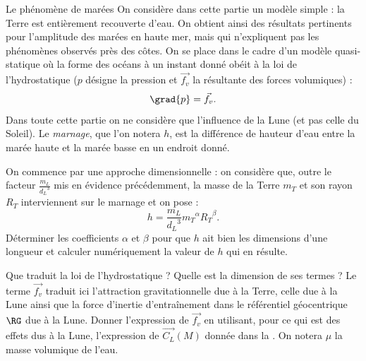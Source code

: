 \begin{exo}[PC][1][devoir]{Le phénomène de marées}
  On considère dans cette partie un modèle simple : la Terre est entièrement recouverte d'eau. On obtient ainsi des résultats pertinents pour l'amplitude des marées en haute mer, mais qui n'expliquent pas les phénomènes observés près des côtes.
  On se place dans le cadre d'un modèle quasi-statique où la forme des océans à un instant donné obéit à la loi de l'hydrostatique ($p$ désigne la pression et $\Vec {{f_v}}$ la résultante des forces volumiques) :
  \begin{equation}
    \grad{p} = \Vec {{f_v}}.
  \end{equation}
  Dans toute cette partie on ne considère que l'influence de la Lune (et pas celle du Soleil). Le \emph{marnage}, que l'on notera $h$, est la différence de hauteur d'eau entre la marée haute et la marée basse en un endroit donné.

  \begin{quest}
  \item On commence par une approche dimensionnelle : on considère que, outre le facteur $\frac{{{m_L}}}{{{d_L}^3}}$ mis en évidence précédemment, la masse de la Terre $m_T$ et son rayon $R_T$ interviennent sur le marnage  et on pose :
  \begin{equation}
    h = \frac{{{m_L}}}{{{d_L}^3}}{m_T}^\alpha {R_T}^\beta.
  \end{equation}
    Déterminer les coefficients $\alpha$ et $\beta$ pour que $ h$ ait bien les dimensions d'une longueur et calculer numériquement la valeur de $ h$ qui en résulte.


  \item
  Que traduit la loi de l'hydrostatique ? Quelle est la dimension de ses termes ?
  Le terme $\Vec {{f_v}}$ traduit ici l'attraction gravitationnelle due à la Terre, celle due à la Lune ainsi que la force d'inertie d'entraînement dans le référentiel géocentrique $\RG$ due à la Lune. Donner l'expression de $\Vec {{f_v}}$ en utilisant, pour ce qui est des effets dus à la Lune, l'expression de $\Vec{C_L}(M)$ donnée dans la . On notera $\mu$ la masse volumique de l'eau.


\end{quest}
\end{exo}
